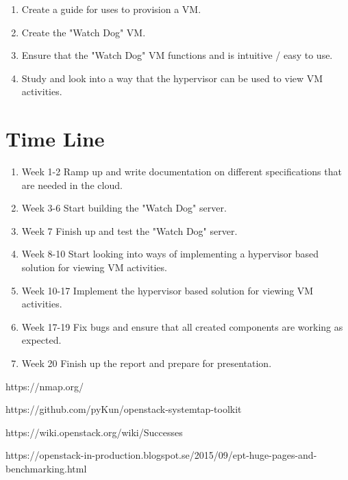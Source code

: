 \documentclass[12pt]{article}
\begin{document}
\begin{enumerate}
    \item Create a guide for uses to provision a VM.
    \item Create the "Watch Dog" VM.
    \item Ensure that the "Watch Dog" VM functions and is intuitive / easy to use.
    \item Study and look into a way that the hypervisor can be used to view VM activities.
\end{enumerate}

\section{Time Line}
\begin{enumerate}
    \item Week 1-2 Ramp up and write documentation on different specifications that are needed in the cloud.
    \item Week 3-6 Start building the "Watch Dog" server.
    \item Week 7 Finish up and test the "Watch Dog" server.
    \item Week 8-10 Start looking into ways of implementing a hypervisor based solution for viewing VM activities.
    \item Week 10-17 Implement the hypervisor based solution for viewing VM activities.
    \item Week 17-19 Fix bugs and ensure that all created components are working as expected.
    \item Week 20 Finish up the report and prepare for presentation.
\end{enumerate}

\begin{thebibliography}{1}

    https://nmap.org/

    https://github.com/pyKun/openstack-systemtap-toolkit

    https://wiki.openstack.org/wiki/Successes

    https://openstack-in-production.blogspot.se/2015/09/ept-huge-pages-and-benchmarking.html

\end{thebibliography}
\end{document}
